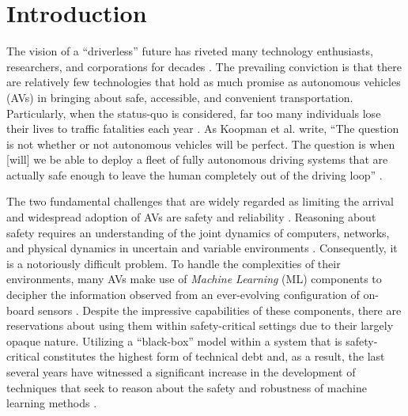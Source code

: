 \documentclass[manuscript,screen,review]{acmart}
\newcommand{\todo}[1]{\textcolor{red}{\textbf{\underline{TODO:}} #1}}
\begin{document}





\maketitle

\section{Introduction}


The vision of a ``driverless'' future has riveted many technology enthusiasts, researchers, and corporations for decades \cite{Badue2019}. The prevailing conviction is that there are relatively few technologies that hold as much promise as autonomous vehicles (AVs) in bringing about safe, accessible, and convenient transportation. Particularly, when the status-quo is considered, far too many individuals lose their lives to traffic fatalities each year \cite{Rasouli2020}. As Koopman et al. write, ``The question is not whether or not autonomous vehicles will be perfect. The question is when [will] we be able to deploy a fleet of fully autonomous driving systems that are actually safe enough to leave the human completely out of the driving loop'' \cite{Koopman2017}. 

The two fundamental challenges that are widely regarded as limiting the arrival and widespread adoption of AVs are safety and reliability \cite{Majumdar2017}. Reasoning about safety requires an understanding of the joint dynamics of computers, networks, and physical dynamics in uncertain and variable environments \cite{Yurtsever2019}. Consequently, it is a notoriously difficult problem. To handle the complexities of their environments, many AVs make use of \emph{Machine Learning} (ML) components to decipher the information observed from an ever-evolving configuration of on-board sensors \cite{Yurtsever2019}. Despite the impressive capabilities of these components, there are reservations about using them within safety-critical settings due to their largely opaque nature. Utilizing a ``black-box'' model within a system that is safety-critical constitutes the highest form of technical debt \cite{Sculley2015} and, as a result, the last several years have witnessed a significant increase in the development of techniques that seek to reason about the safety and robustness of machine learning methods \cite{xiang20118survey}.
\end{document}
